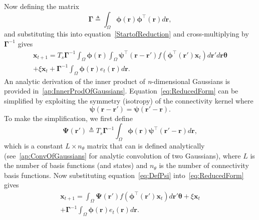 \documentclass[10pt]{article}
\begin{document}
Now defining the matrix
\begin{equation}\label{eq:DefGamma}
	\boldsymbol{\Gamma} \triangleq \int_\Omega {\boldsymbol{\phi} \left(\mathbf{r}\right)\boldsymbol{\phi} ^{\top}\left(\mathbf{r}\right)d\mathbf{r}}, 
\end{equation}
and substituting this into equation~\ref{StartofReduction} and cross-multiplying by $\boldsymbol{\Gamma}^{-1}$ gives 
\begin{equation}
    \label{eq:ReducedForm}
    \begin{split}
	 \mathbf{x}_{t+1} = T_s\boldsymbol{\Gamma}^{-1}
	 \int_\Omega \boldsymbol{\phi}(\mathbf{r}) 
	 \int_\Omega \boldsymbol{\psi}^{\top} (\mathbf{r}-\mathbf{r}')f(\boldsymbol{\phi}^{\top}(\mathbf{r}')\mathbf{x}_t) d\mathbf{r}' d\mathbf{r} \boldsymbol{\theta} \\ 
	 + \xi\mathbf{x}_t + \boldsymbol{\Gamma}^{-1} \int_\Omega{\boldsymbol{\phi}(\mathbf{r}) e_t(\mathbf{r})d\mathbf{r}}.
	 \end{split}
\end{equation}
An analytic derivation of the inner product of \emph{n}-dimensional Gaussians is provided in~\ref{ap:InnerProdOfGaussians}. Equation~\ref{eq:ReducedForm} can be simplified by exploiting the symmetry (isotropy) of the connectivity kernel where
\begin{equation}
	\boldsymbol{\psi} (\mathbf{r}-\mathbf{r}') = \boldsymbol{\psi} (\mathbf{r}'-\mathbf{r}).
\end{equation}
To make the simplification, we first define
\begin{equation}\label{eq:DefPsi}
	\boldsymbol{\Psi}(\mathbf{r}') \triangleq T_s\boldsymbol{\Gamma}^{-1}\int_\Omega {\boldsymbol{\phi}(\mathbf{r})\boldsymbol{\psi}^{\top} (\mathbf{r}'-\mathbf{r})d\mathbf{r}},
\end{equation}
which is a constant $L \times n_{\theta}$ matrix that can is defined analytically (see~\ref{ap:ConvOfGaussians} for analytic convolution of two Gaussians), where $L$ is the number of basis functions (and states) and $n_{\theta}$ is the number of connectivity basis functions. Now substituting equation~\ref{eq:DefPsi} into~\ref{eq:ReducedForm} gives
\begin{eqnarray}
	\mathbf{x}_{t+1} = \int_\Omega \boldsymbol{\Psi}(\mathbf{r}') f(\boldsymbol{\phi}^{\top}(\mathbf{r}')\mathbf{x}_t) d\mathbf{r}' \boldsymbol{\theta} + \xi\mathbf{x}_t\nonumber \\
+ \boldsymbol{\Gamma}^{-1} \int_\Omega{\boldsymbol{\phi}(\mathbf{r})e_t(\mathbf{r})d\mathbf{r}}.
\end{eqnarray}
\end{document}
